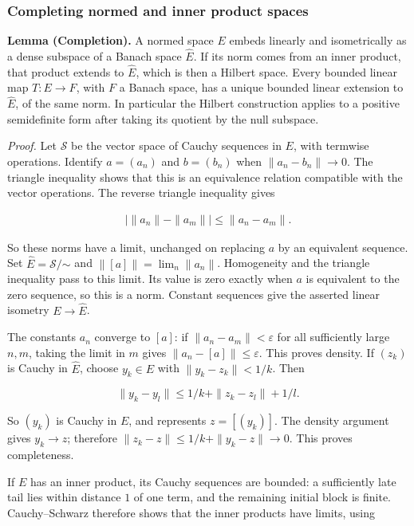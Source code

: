 \documentclass[
  english,
  11pt,
  a4paper,
]{article}
\begin{document}
\subsubsection{Completing normed and inner product
spaces}\label{hilbert-spaces-and-compact-operators--completing-normed-and-inner-product-spaces}

\textbf{Lemma (Completion).} A normed space \(E\) embeds linearly and
isometrically as a dense subspace of a Banach space \(\widehat E\). If
its norm comes from an inner product, that product extends to
\(\widehat E\), which is then a Hilbert space. Every bounded linear map
\(T:E\to F\), with \(F\) a Banach space, has a unique bounded linear
extension to \(\widehat E\), of the same norm. In particular the Hilbert
construction applies to a positive semidefinite form after taking its
quotient by the null subspace.

\emph{Proof.} Let \(\mathscr S\) be the vector space of Cauchy sequences
in \(E\), with termwise operations. Identify \(a=(a_n)\) and \(b=(b_n)\)
when \(\|a_n-b_n\|\to0\). The triangle inequality shows that this is an
equivalence relation compatible with the vector operations. The reverse
triangle inequality gives

\[\begin{gathered}
|\|a_n\|-\|a_m\||\leq\|a_n-a_m\|.
\end{gathered}\]

So these norms have a limit, unchanged on replacing \(a\) by an
equivalent sequence. Set \(\widehat E=\mathscr S/\mathord\sim\) and
\(\|[a]\|=\lim_n\|a_n\|\). Homogeneity and the triangle inequality pass
to this limit. Its value is zero exactly when \(a\) is equivalent to the
zero sequence, so this is a norm. Constant sequences give the asserted
linear isometry \(E\to\widehat E\).

The constants \(a_n\) converge to \([a]\): if
\(\|a_n-a_m\|<\varepsilon\) for all sufficiently large \(n,m\), taking
the limit in \(m\) gives \(\|a_n-[a]\|\leq\varepsilon\). This proves
density. If \((z_k)\) is Cauchy in \(\widehat E\), choose \(y_k\in E\)
with \(\|y_k-z_k\|<1/k\). Then

\[\|y_k-y_l\|\leq1/k+\|z_k-z_l\|+1/l.\]

So \((y_k)\) is Cauchy in \(E\), and represents \(z=[(y_k)]\). The
density argument gives \(y_k\to z\); therefore
\(\|z_k-z\|\leq1/k+\|y_k-z\|\to0\). This proves completeness.

If \(E\) has an inner product, its Cauchy sequences are bounded: a
sufficiently late tail lies within distance \(1\) of one term, and the
remaining initial block is finite. Cauchy--Schwarz therefore shows that
the inner products have limits, using
\end{document}
